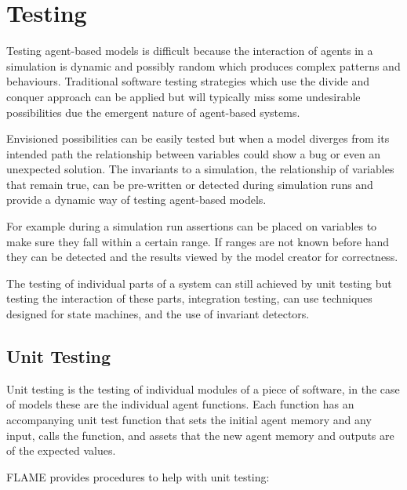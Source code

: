 \section{Testing}

Testing agent-based models is difficult because the interaction of agents in a
simulation is dynamic and possibly random which produces complex patterns and
behaviours. Traditional software testing strategies which use the divide and
conquer approach can be applied but will typically miss some undesirable
possibilities due the emergent nature of agent-based systems.

Envisioned possibilities can be easily tested but when a model diverges from
its intended path the relationship between variables could show a bug or even
an unexpected solution. The invariants to a simulation, the relationship of
variables that remain true, can be pre-written or detected during simulation
runs and provide a dynamic way of testing agent-based models.

For example during a simulation run assertions can be placed on variables to
make sure they fall within a certain range. If ranges are not known before hand
they can be detected and the results viewed by the model creator for
correctness.

The testing of individual parts of a system can still achieved by unit testing
but testing the interaction of these parts, integration testing, can use
techniques designed for state machines, and the use of invariant detectors.

\subsection{Unit Testing}

Unit testing is the testing of individual modules of a piece of software, in the
case of models these are the individual agent functions. Each function has an
accompanying unit test function that sets the initial agent memory and any input,
calls the function, and assets that the new agent memory and outputs are of the
expected values.

FLAME provides procedures to help with unit testing:

